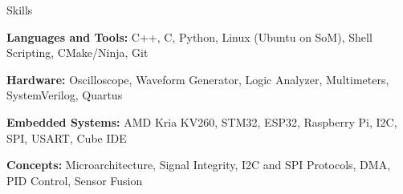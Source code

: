 \documentclass{template} %
\begin{document}

\begin{rSection}{Skills}
\vspace{0.1em}
  \begin{rSummarySection}
{
\item \textbf{Languages and Tools:} C++, C, Python, Linux (Ubuntu on SoM), Shell Scripting, CMake/Ninja, Git \vspace{0.2em}
    \item \textbf{Hardware:} Oscilloscope, Waveform Generator, Logic Analyzer, Multimeters, SystemVerilog, Quartus\vspace{0.2em}
    \item \textbf{Embedded Systems:} AMD Kria KV260, STM32, ESP32, Raspberry Pi, I2C, SPI, USART, Cube IDE\vspace{0.2em}
    \item \textbf{Concepts:} Microarchitecture, Signal Integrity, I2C and SPI Protocols, DMA, PID Control, Sensor Fusion 

  }
  \end{rSummarySection}
\end{rSection}
\vspace{0.3em}
\end{document}
